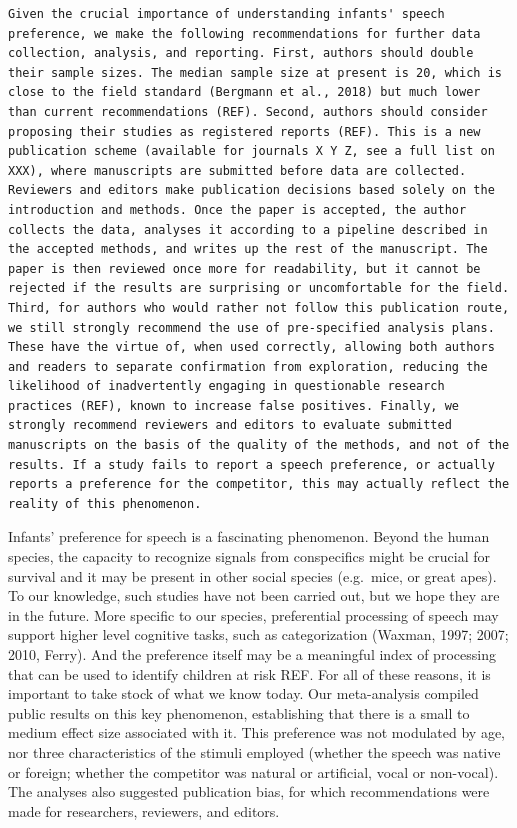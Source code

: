 \documentclass[man]{apa6}
\begin{document}
\begin{verbatim}
Given the crucial importance of understanding infants' speech preference, we make the following recommendations for further data collection, analysis, and reporting. First, authors should double their sample sizes. The median sample size at present is 20, which is close to the field standard (Bergmann et al., 2018) but much lower than current recommendations (REF). Second, authors should consider proposing their studies as registered reports (REF). This is a new publication scheme (available for journals X Y Z, see a full list on XXX), where manuscripts are submitted before data are collected. Reviewers and editors make publication decisions based solely on the introduction and methods. Once the paper is accepted, the author collects the data, analyses it according to a pipeline described in the accepted methods, and writes up the rest of the manuscript. The paper is then reviewed once more for readability, but it cannot be rejected if the results are surprising or uncomfortable for the field. Third, for authors who would rather not follow this publication route, we still strongly recommend the use of pre-specified analysis plans. These have the virtue of, when used correctly, allowing both authors and readers to separate confirmation from exploration, reducing the likelihood of inadvertently engaging in questionable research practices (REF), known to increase false positives. Finally, we strongly recommend reviewers and editors to evaluate submitted manuscripts on the basis of the quality of the methods, and not of the results. If a study fails to report a speech preference, or actually reports a preference for the competitor, this may actually reflect the reality of this phenomenon.
\end{verbatim}

Infants' preference for speech is a fascinating phenomenon. Beyond the
human species, the capacity to recognize signals from conspecifics might
be crucial for survival and it may be present in other social species
(e.g.~mice, or great apes). To our knowledge, such studies have not been
carried out, but we hope they are in the future. More specific to our
species, preferential processing of speech may support higher level
cognitive tasks, such as categorization (Waxman, 1997; 2007; 2010,
Ferry). And the preference itself may be a meaningful index of
processing that can be used to identify children at risk REF. For all of
these reasons, it is important to take stock of what we know today. Our
meta-analysis compiled public results on this key phenomenon,
establishing that there is a small to medium effect size associated with
it. This preference was not modulated by age, nor three characteristics
of the stimuli employed (whether the speech was native or foreign;
whether the competitor was natural or artificial, vocal or non-vocal).
The analyses also suggested publication bias, for which recommendations
were made for researchers, reviewers, and editors.

\newpage

\begingroup
\setlength{\parindent}{-0.5in} \setlength{\leftskip}{0.5in}

\hypertarget{refs}{}

\endgroup
\end{document}
